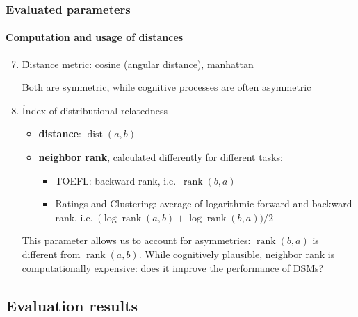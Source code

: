 \documentclass[t]{beamer} %
\begin{document}
\begin{frame}
  \frametitle{Evaluated parameters}
  \framesubtitle{Computation and usage of distances}   

  \begin{enumerate}
    \setcounter{enumi}{6}      
  \item   \h{Distance metric}: cosine (angular distance), manhattan
    \begin{block}{}\small
      Both are symmetric, while cognitive processes are often asymmetric
    \end{block}
    
  \item  \h{Index of distributional relatedness}
    \begin{itemize}
    \item \textbf{distance}: $\mathop{\text{dist}}(a,b)$
    \item  \textbf{neighbor rank}, calculated differently for different tasks:
      \begin{itemize}
      \item TOEFL: backward rank, i.e.\ $\mathop{\text{rank}}(b,a)$
      \item Ratings and Clustering: average of logarithmic forward and backward rank, i.e.\ $\bigl(\log \mathop{\text{rank}}(a,b) + \log \mathop{\text{rank}}(b,a)\bigr) / 2$
      \end{itemize}
    \end{itemize}    
    \begin{block}{}\small
      This parameter allows us to account for asymmetries: $\mathop{\text{rank}}(b,a)$ is different from $\mathop{\text{rank}}(a,b)$. While cognitively plausible, neighbor rank is computationally expensive: does it improve the performance of DSMs?
    \end{block}                
    
  \end{enumerate}   
\end{frame}

\subsection{Evaluation results}
\end{document}
